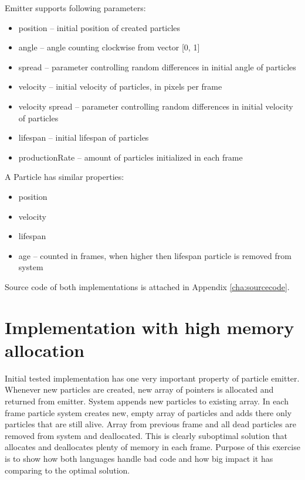 Emitter supports following parameters:

\begin{itemize}
	\item position -- initial position of created particles
	\item angle -- angle counting clockwise from vector [0, 1]
	\item spread -- parameter controlling random differences in initial angle of particles
	\item velocity -- initial velocity of particles, in pixels per frame
	\item velocity spread -- parameter controlling random differences in initial velocity of particles
	\item lifespan -- initial lifespan of particles
	\item productionRate -- amount of particles initialized in each frame
\end{itemize}

A Particle has similar properties:
\begin{itemize}
	\item position
	\item velocity
	\item lifespan
	\item age -- counted in frames, when higher then lifespan particle is removed from system
\end{itemize}

Source code of both implementations is attached in Appendix \ref{cha:sourcecode}.

\section{Implementation with high memory allocation}
\label{sec:particlesinitial}

Initial tested implementation has one very important property of particle emitter. Whenever new particles are created, new array of pointers is allocated and returned from emitter. System appends new particles to existing array. In each frame particle system creates new, empty array of particles and adds there only particles that are still alive. Array from previous frame and all dead particles are removed from system and deallocated. This is clearly suboptimal solution that allocates and deallocates plenty of memory in each frame. Purpose of this exercise is to show how both languages handle bad code and how big impact it has comparing to the optimal solution.

